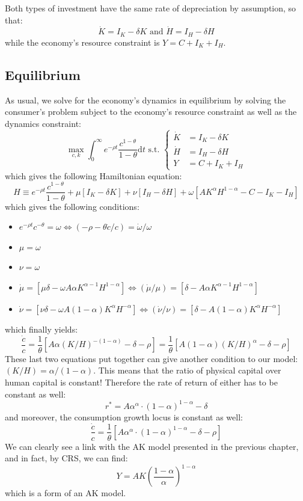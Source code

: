 \documentclass[12pt]{report}
\def\D{\mathrm{d}}
\begin{document}
Both types of investment have the same rate of depreciation by assumption, so that: $$\dot K = I_K - \delta K \text{ and } \dot H = I_H - \delta H $$ while the economy's resource constraint is $Y = C + I_K + I_H $.

\subsection{Equilibrium}

As usual, we solve for the economy's dynamics in equilibrium by solving the consumer's problem subject to the economy's resource constraint as well as the dynamics constraint: $$\max_{c, k} \int_0^\infty e^{-\rho t} \frac{c^{1-\theta}}{1 - \theta}\D t \text{ s.t. } \begin{cases} \dot K & = I_K - \delta K \\
\dot H & = I_H - \delta H \\
Y & = C + I_K + I_H
\end{cases} $$ which gives the following Hamiltonian equation: $$ H\equiv e^{-\rho t} \frac{c^{1-\theta}}{1 - \theta} + \mu [I_K - \delta K] + \nu [I_H - \delta H] + \omega [AK^\alpha H^{1 - \alpha} - C - I_K - I_H ] $$ which gives the following conditions:\begin{itemize}
\item $e^{-\rho t} c^{-\theta} = \omega \Leftrightarrow (-\rho - \theta \dot c/c) = \dot \omega / \omega $
\item $\mu = \omega$
\item $\nu = \omega$
\item $\dot\mu = [\mu\delta - \omega A\alpha K^{\alpha -1 }H^{1 - \alpha}] \Leftrightarrow (\dot\mu /\mu)= [\delta - A\alpha K^{\alpha -1 }H^{1 - \alpha}]$
\item $\dot\nu = [\nu\delta - \omega A(1-\alpha) K^{\alpha}H^{- \alpha}] \Leftrightarrow (\dot\nu /\nu)= [\delta - A(1-\alpha) K^{\alpha}H^{- \alpha}]$
\end{itemize} which finally yields: $$\frac{\dot c}{c} = \frac{1}{\theta} [A\alpha(K/H)^{-(1-\alpha)} - \delta - \rho] = \frac{1}{\theta} [A(1-\alpha)(K/H)^{\alpha} - \delta - \rho]$$ These last two equations put together can give another condition to our model: $(K/H) = \alpha/(1-\alpha)$. This means that the ratio of physical capital over human capital is constant! Therefore the rate of return of either has to be constant as well: $$r^* = A\alpha^\alpha\cdot(1-\alpha)^{1-\alpha} - \delta $$ and moreover, the consumption growth locus is constant as well:$$ \frac{\dot c}{c} = \frac{1}{\theta} [A\alpha^\alpha\cdot(1-\alpha)^{1-\alpha} - \delta - \rho]$$ We can clearly see a link with the AK model presented in the previous chapter, and in fact, by CRS, we can find: $$Y = AK\left(\frac{1-\alpha}{\alpha}\right)^{1-\alpha} $$ which is a form of an AK model.
\end{document}
